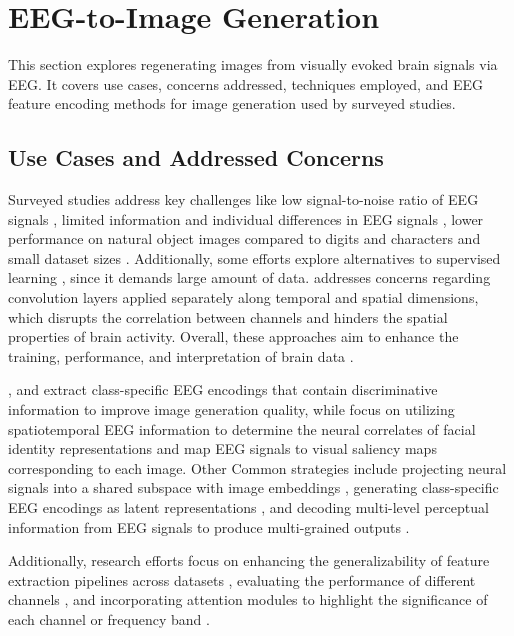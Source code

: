 \section{EEG-to-Image Generation}
\label{sec:bci_cv}

This section explores regenerating images from visually evoked brain signals via EEG. It covers use cases, concerns addressed, techniques employed, and EEG feature encoding methods for image generation used by surveyed studies.

\subsection{Use Cases and Addressed Concerns}

Surveyed studies address key challenges like low signal-to-noise ratio of EEG signals \cite{bai2306dreamdiffusion, lan2023seeing, zeng2023dm}, limited information and individual differences in EEG signals \cite{bai2306dreamdiffusion}, lower performance on natural object images compared to digits and characters \cite{mishra2023neurogan} and small dataset sizes \cite{singh2023eeg2image}. Additionally, some efforts explore alternatives to supervised learning \cite{li2020semi, song2023decoding}, since it demands large amount of data. \citet{song2023decoding} addresses concerns regarding convolution layers applied separately along temporal and spatial dimensions, which disrupts the correlation between channels and hinders the spatial properties of brain activity. Overall, these approaches aim to enhance the training, performance, and interpretation of brain data \cite{li2024visual}.

\citet{kavasidis2017brain2image}, \citet{song2023decoding} and \citet{mishra2023neurogan} extract class-specific EEG encodings that contain discriminative information to improve image generation quality, while \cite{nemrodovneural} focus on utilizing spatiotemporal EEG information to determine the neural correlates of facial identity representations and \cite{khaleghi2022visual} map EEG signals to visual saliency maps corresponding to each image. Other Common strategies include projecting neural signals into a shared subspace with image embeddings \cite{shimizu2022improving}, generating class-specific EEG encodings as latent representations \cite{mishra2023neurogan}, and decoding multi-level perceptual information from EEG signals to produce multi-grained outputs \cite{lan2023seeing}.

Additionally, research efforts focus on enhancing the generalizability of feature extraction pipelines across datasets \cite{singh2024learning}, evaluating the performance of different channels \cite{sugimoto2024image}, and incorporating attention modules to highlight the significance of each channel or frequency band \cite{li2024visual}.

